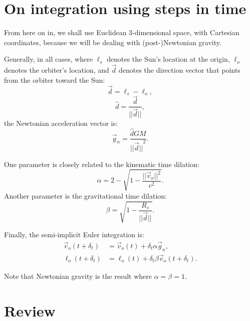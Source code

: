 \documentclass[12pt]{article}
\begin{document}
\section{On integration using steps in time}

From here on in, we shall use Euclidean 3-dimensional space, with Cartesian coordinates, because we will be dealing with (post-)Newtonian gravity.

Generally, in all cases, where $\ell_s$ denotes the Sun's location at the origin, $\ell_o$ denotes the orbiter's location, and $\vec{d}$ denotes the direction vector that points from the orbiter toward the Sun:
\begin{equation}
\label{direction_vector}
\vec{d} = \ell_{s} - \ell_{o},	
\end{equation}
\begin{equation}
\label{direction_unit_vector}
\hat{d} = \frac{\vec{d}}{\lvert\lvert \vec{d} \rvert\rvert},
\end{equation}
the Newtonian acceleration vector is:
\begin{equation}
\label{newton}
\vec{g}_n = \frac{\hat{d} G M}{{\lvert\lvert \vec{d} \rvert\rvert}^2}.
\end{equation}

One parameter is closely related to the kinematic time dilation:
\begin{equation}
\label{eq_kinematic}
\alpha = 2 - \sqrt{1 - \frac{\lvert\lvert \vec{v}_{o}\rvert\rvert^2}{c^2}}.
\end{equation}
Another parameter is the gravitational time dilation:
\begin{equation}
\label{eq_gravitational}
\beta = \sqrt{1 - \frac{R_{s}}{\lvert \lvert \vec{d} \rvert \rvert}}.
\end{equation}

Finally, the semi-implicit Euler integration is:
\begin{align}
\label{eq_velocity}
\vec{v}_{o}(t + \delta_t) &= \vec{v}_{o}(t) + \delta_{t} \alpha \vec{g}_n, \\
\label{eq_position}
\ell_{o}(t + \delta_t) &= \ell_{o}(t) + \delta_{t} \beta \vec{v}_{o}(t + \delta_t).
\end{align}

Note that Newtonian gravity is the result where $\alpha = \beta = 1$.





\section {Review}
\end{document}
